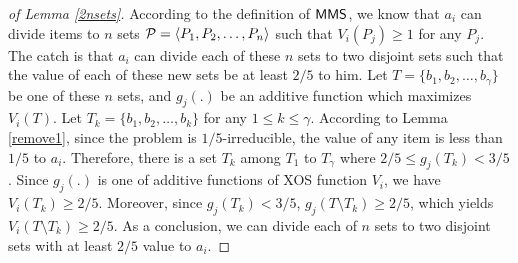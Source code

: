 \begin{proof}[of Lemma \ref{2nsets}]
According to the definition of $\mathsf{MMS}$, we know that $a_{i}$ can divide items to $n$ sets ${\cal P} = \langle P_1, P_2, \ldots, P_n \rangle$ such that $V_i(P_j) \geq 1$ for any $P_j$. The catch is that $a_i$ can divide each of these $n$ sets to two disjoint sets such that the value of each of these new sets be at least $2/5$ to him. Let $T = \{b_1, b_2, \ldots, b_\gamma\}$ be one of these $n$ sets, and $g_j(.)$ be an additive function which maximizes $V_i(T)$. Let $T_k = \{b_1, b_2, \ldots, b_k\}$ for any $1 \leq k \leq \gamma$. According to Lemma \ref{remove1}, since the problem is $1/5$-irreducible, the value of any item is less than $1/5$ to $a_i$. Therefore, there is a set $T_k$ among $T_1$ to $T_\gamma$ where $2/5 \leq g_j(T_k) < 3/5$. Since $g_j(.)$ is one of additive functions of XOS function $V_i$, we have $V_i(T_k) \geq 2/5$. Moreover, since $g_j(T_k) < 3/5$, $g_j(T \setminus T_k) \geq 2/5$, which yields $V_i(T \setminus T_k) \geq 2/5$. As a conclusion, we can divide each of $n$ sets to two disjoint sets with at least $2/5$ value to $a_i$.

\end{proof}

 
